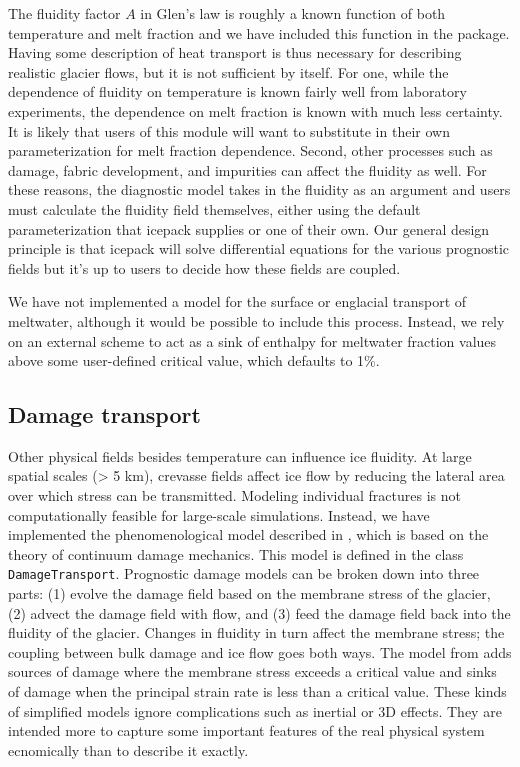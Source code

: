 \documentclass{article}
\theoremstyle{definition}
\theoremstyle{plain}
\begin{document}
The fluidity factor $A$ in Glen's law is roughly a known function of both temperature and melt fraction and we have included this function in the package.
Having some description of heat transport is thus necessary for describing realistic glacier flows, but it is not sufficient by itself.
For one, while the dependence of fluidity on temperature is known fairly well from laboratory experiments, the dependence on melt fraction is known with much less certainty.
It is likely that users of this module will want to substitute in their own parameterization for melt fraction dependence.
Second, other processes such as damage, fabric development, and impurities can affect the fluidity as well.
For these reasons, the diagnostic model takes in the fluidity as an argument and users must calculate the fluidity field themselves, either using the default parameterization that icepack supplies or one of their own.
Our general design principle is that icepack will solve differential equations for the various prognostic fields but it's up to users to decide how these fields are coupled.

We have not implemented a model for the surface or englacial transport of meltwater, although it would be possible to include this process.
Instead, we rely on an external scheme to act as a sink of enthalpy for meltwater fraction values above some user-defined critical value, which defaults to 1\%.

\subsection{Damage transport} \label{sec:damage-transport}

Other physical fields besides temperature can influence ice fluidity.
At large spatial scales (> 5 km), crevasse fields affect ice flow by reducing the lateral area over which stress can be transmitted.
Modeling individual fractures is not computationally feasible for large-scale simulations.
Instead, we have implemented the phenomenological model described in \citet{albrecht2014fracture}, which is based on the theory of continuum damage mechanics.
This model is defined in the class \texttt{DamageTransport}.
Prognostic damage models can be broken down into three parts: (1) evolve the damage field based on the membrane stress of the glacier, (2) advect the damage field with flow, and (3) feed the damage field back into the fluidity of the glacier.
Changes in fluidity in turn affect the membrane stress; the coupling between bulk damage and ice flow goes both ways.
The model from \citet{albrecht2014fracture} adds sources of damage where the membrane stress exceeds a critical value and sinks of damage when the principal strain rate is less than a critical value.
These kinds of simplified models ignore complications such as inertial or 3D effects.
They are intended more to capture some important features of the real physical system ecnomically than to describe it exactly.
\end{document}
